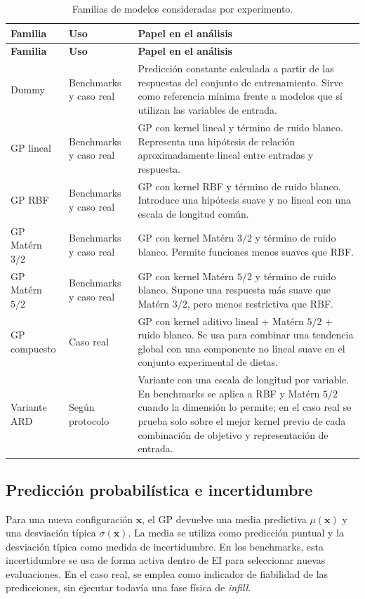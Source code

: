 \protect{}\label{tab:modelos_capitulo}
\begin{longtable}[]{@{}lll@{}}
\caption{Familias de modelos consideradas por experimento.}\tabularnewline
\toprule\noalign{}
\textbf{Familia} & \textbf{Uso} & \textbf{Papel en el análisis} \\
\midrule\noalign{}
\endfirsthead
\toprule\noalign{}
\textbf{Familia} & \textbf{Uso} & \textbf{Papel en el análisis} \\
\midrule\noalign{}
\endhead
\bottomrule\noalign{}
\endlastfoot
Dummy & Benchmarks y caso real & Predicción constante calculada a partir de las respuestas del conjunto de entrenamiento. Sirve como referencia mínima frente a modelos que sí utilizan las variables de entrada. \\
GP lineal & Benchmarks y caso real & GP con kernel lineal y término de ruido blanco. Representa una hipótesis de relación aproximadamente lineal entre entradas y respuesta. \\
GP RBF & Benchmarks y caso real & GP con kernel RBF y término de ruido blanco. Introduce una hipótesis suave y no lineal con una escala de longitud común. \\
GP Matérn \(3/2\) & Benchmarks y caso real & GP con kernel Matérn \(3/2\) y término de ruido blanco. Permite funciones menos suaves que RBF. \\
GP Matérn \(5/2\) & Benchmarks y caso real & GP con kernel Matérn \(5/2\) y término de ruido blanco. Supone una respuesta más suave que Matérn \(3/2\), pero menos restrictiva que RBF. \\
GP compuesto & Caso real & GP con kernel aditivo lineal + Matérn \(5/2\) + ruido blanco. Se usa para combinar una tendencia global con una componente no lineal suave en el conjunto experimental de dietas. \\
Variante ARD & Según protocolo & Variante con una escala de longitud por variable. En benchmarks se aplica a RBF y Matérn \(5/2\) cuando la dimensión lo permite; en el caso real se prueba solo sobre el mejor kernel previo de cada combinación de objetivo y representación de entrada. \\
\end{longtable}

\subsection{Predicción probabilística e incertidumbre}\label{subsubsec:prediccion_incertidumbre}

Para una nueva configuración \(\bm{x}\), el GP devuelve una media predictiva \(\mu(\bm{x})\) y una desviación típica \(\sigma(\bm{x})\). La media se utiliza como predicción puntual y la desviación típica como medida de incertidumbre. En los benchmarks, esta incertidumbre se usa de forma activa dentro de EI para seleccionar nuevas evaluaciones. En el caso real, se emplea como indicador de fiabilidad de las predicciones, sin ejecutar todavía una fase física de \emph{infill}.

